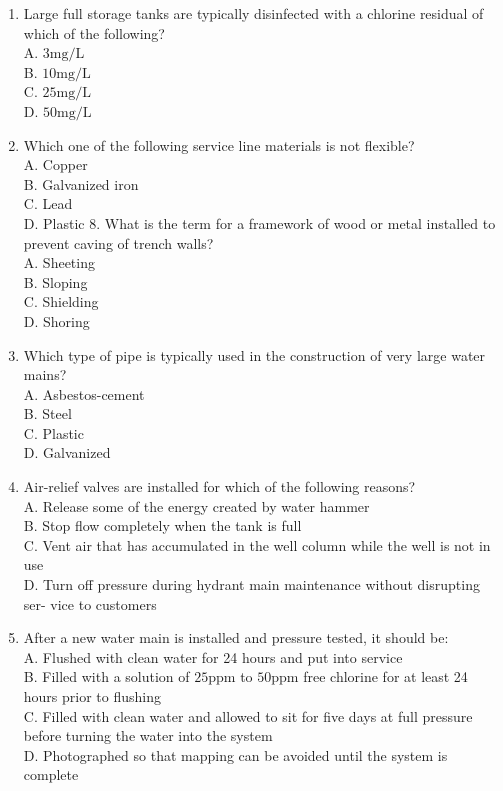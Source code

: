 \documentclass[10pt]{article}
\begin{document}
\begin{enumerate}
  \item Large full storage tanks are typically disinfected with a chlorine residual of which of the following?\\
A. $3 \mathrm{mg} / \mathrm{L}$\\
B. $10 \mathrm{mg} / \mathrm{L}$\\
C. $25 \mathrm{mg} / \mathrm{L}$\\
D. $50 \mathrm{mg} / \mathrm{L}$

  \item Which one of the following service line materials is not flexible?\\
A. Copper\\
B. Galvanized iron\\
C. Lead\\
D. Plastic 8. What is the term for a framework of wood or metal installed to prevent caving of trench walls?\\
A. Sheeting\\
B. Sloping\\
C. Shielding\\
D. Shoring

  \item Which type of pipe is typically used in the construction of very large water mains?\\
A. Asbestos-cement\\
B. Steel\\
C. Plastic\\
D. Galvanized

  \item Air-relief valves are installed for which of the following reasons?\\
A. Release some of the energy created by water hammer\\
B. Stop flow completely when the tank is full\\
C. Vent air that has accumulated in the well column while the well is not in use\\
D. Turn off pressure during hydrant main maintenance without disrupting ser- vice to customers

  \item After a new water main is installed and pressure tested, it should be:\\
A. Flushed with clean water for 24 hours and put into service\\
B. Filled with a solution of $25 \mathrm{ppm}$ to $50 \mathrm{ppm}$ free chlorine for at least 24 hours prior to flushing\\
C. Filled with clean water and allowed to sit for five days at full pressure before turning the water into the system\\
D. Photographed so that mapping can be avoided until the system is complete


\end{enumerate}
\end{document}
